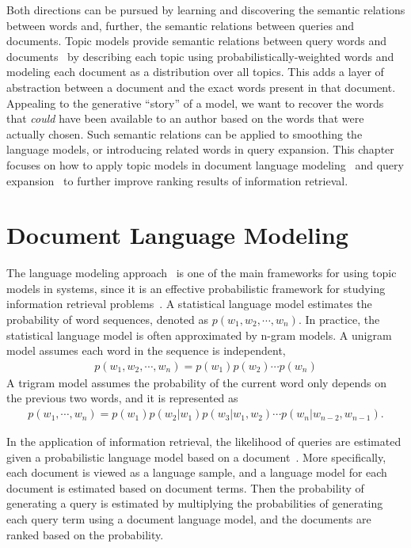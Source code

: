 Both directions can be pursued by learning and discovering the
semantic relations between words and, further, the semantic relations
between queries and documents. Topic models provide semantic relations between query words and
documents~\citep{deerwester-90,hofmann-99a} by describing each topic
using probabilistically-weighted words and modeling each document as a distribution over
all topics.
This adds a layer of abstraction between a document and the exact words present in that document.
Appealing to the generative ``story'' of a model, we want to recover the words that {\em could} have been available to an author based on the words that were actually chosen.
Such semantic relations
can be applied to smoothing the language models, or introducing
related words in query expansion. This chapter focuses on how to apply
topic models in document language modeling~\citep{Lu-2011,wei-06} and
query expansion~\citep{Park-2009,Andrzejewski-2011} to further improve
 ranking results of information retrieval.

\section{Document Language Modeling}
\label{sec:ir-lm}

The language modeling approach~\citep{PonteCroft,song-99,croft-03} is
one of the main frameworks for using topic models in  systems, since
it is an effective probabilistic framework for studying
information retrieval problems~\citep{PonteCroft,berger-99}.
A statistical language model estimates the probability of word
sequences, denoted as $p(w_1,w_2,\cdots,w_n)$. In practice, the
statistical language model is often approximated by n-gram models. A
unigram model assumes each word in the sequence is independent,
\begin{align}
p(w_1,w_2,\cdots,w_n) = p(w_1)p(w_2) \cdots p(w_n)
\end{align}
A trigram model assumes the probability of the current word only
depends on the previous two words, and it is represented as
\begin{align}
p(w_1,\cdots,w_n)=p(w_1)p(w_2|w_1)p(w_3|w_1,w_2)\cdots p(w_n|w_{n-2},w_{n-1}).
\end{align}

In the application of information retrieval, the likelihood of queries
are estimated given a probabilistic language model based on a
document~\citep{zhai-01}. More specifically, each document is viewed
as a language sample, and a language model for each document is
estimated based on document terms. Then the
probability of generating a query is estimated by multiplying the probabilities of
generating each query term using a document language model,
and the documents are ranked based on the probability.

